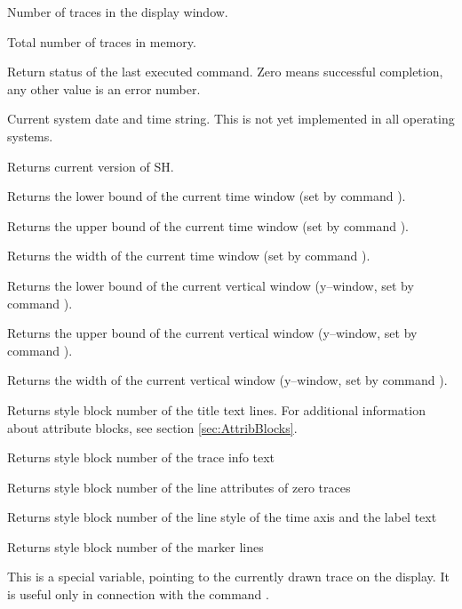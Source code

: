 \begin{deflist}{}
\item[\exm{\$dsptrcs}]
   Number of traces in the display window.
\item[\exm{\$tottrcs}]
   Total number of traces in memory.
\item[\exm{\$status}]
   Return status of the last executed command.  Zero means
   successful completion, any other value is an error number.
\item[\exm{\$systime}]
   Current system date and time string.  This is not yet implemented
   in all operating systems.
\item[\exm{\$version}]
   Returns current version of SH.
\item[\exm{\$dsp\_x}]
   Returns the lower bound of the current time window (set by command
   ).
\item[\exm{\$dsp\_xmax}]
   Returns the upper bound of the current time window (set by command
   ).
\item[\exm{\$dsp\_w}]
   Returns the width of the current time window (set by command
   ).
\item[\exm{\$dsp\_y}]
   Returns the lower bound of the current vertical window
   (y--window, set by command ).
\item[\exm{\$dsp\_ymax}]
   Returns the upper bound of the current vertical window
   (y--window, set by command ).
\item[\exm{\$dsp\_h}]
   Returns the width of the current vertical window (y--window,
   set by command ).
\item[\exm{\$titlestyle}]
   Returns style block number of the title text lines.  For
   additional information about attribute blocks, see section
   \ref{sec:AttribBlocks}.
\item[\exm{\$trcinfostyle}]
   Returns style block number of the trace info text
\item[\exm{\$zerotrcstyle}]
   Returns style block number of the line attributes of zero traces
\item[\exm{\$timeaxisstyle}]
   Returns style block number of the line style of the time axis
   and the label text
\item[\exm{\$markstyle}]
   Returns style block number of the marker lines
\item[\exm{\$x}]
   This is a special variable, pointing to the currently drawn
   trace on the display.  It is useful only in connection with
   the command .
\end{deflist}

